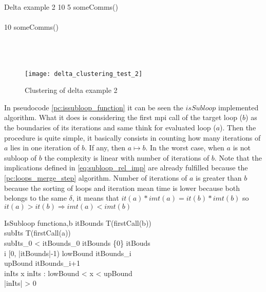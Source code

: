 \begin{multicols}{2}
  \begin{pseudocode}{Delta example 2}{ }
  \label{pc:delta_classification_example_2}
        10 \DO 
      \BEGIN 
          5 \DO
        \BEGIN 
            someComms() \\
        \END \\
          10 \DO
        \BEGIN 
            someComms()\\
        \END \\
         \\
      \END \\
  \end{pseudocode}
  \columnbreak
  \begin{figure}[H]
    \centering
    \texttt{[image: delta\_clustering\_test\_2]}
    \caption{Clustering of delta example 2}
    \label{fig:delta_classification_2}
  \end{figure}
\end{multicols}

In pseudocode \ref{pc:issubloop_function} it can be seen the $isSubloop$ implemented
algorithm. What it does is considering the first mpi call of the target loop
($b$) as the boundaries of its iterations and same think for evaluated loop
($a$). Then the procedure is quite simple, it basically consists in counting how
many iterations of $a$ lies in one iteration of $b$. If any, then $a
\mapsto b$. In the worst case, when $a$ is not subloop of $b$ the
complexity is linear with number of iterations of $b$. Note that the
implications defined in \ref{eq:subloop_rel_imp} are already fulfilled because
the \ref{pc:loops_merge_step} algorithm. Number of iterations of $a$ is greater
than $b$
because the sorting of loops and iteration mean time is lower because both
belongs to the same $\delta$, it means that $it(a)*imt(a) = it(b)*imt(b)$ so $it(a)
> it(b) \Rightarrow imt(a) < imt(b)$

\begin{pseudocode}{IsSubloop function}{a,b}
\label{pc:issubloop_function}
    itBounds \GETS T(firstCall(b)) \\
    subIts \GETS T(firstCall(a)) \\

    \IF subIts_{0} < itBounds_{0} \THEN
        itBounds \GETS \{0\} \cup itBouds \\

    \FOR i \in [0, |itBounds|-1) \DO
    \BEGIN
        lowBound \GETS itBounds_{i} \\
        upBound \GETS itBounds_{i+1} \\

        inIts \GETS \forall x \in inIts : lowBound < x < upBound \\
        \IF |inIts| > 0 \THEN
    \END \\
\end{pseudocode}

